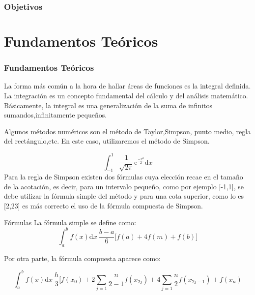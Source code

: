 \documentclass{beamer}
\begin{document}
\begin{frame}

\frametitle{Objetivos }

\end{frame}

\section{Fundamentos Teóricos}


\begin{frame}
\frametitle{Fundamentos Teóricos}
\begin{block}{}
La forma más común a la hora de hallar áreas de funciones es la integral definida.
La integración es un concepto fundamental del cálculo y del análisis matemático. Básicamente, la integral es una generalización 
de la suma de infinitos sumandos,infinitamente pequeños.
\end{block}
\begin{block}{}
 Algunos métodos numéricos son el método de Taylor,Simpson, punto medio, regla del rectángulo,etc. En este caso, utilizaremos el método de Simpson.
\end{block}
\end{frame}

\begin{frame}
\begin{block}{}

\[\int_{-1}^{1} \frac{1}{\sqrt{2\pi}}\text{e}^{\frac{-x^2}{2}} \text{d}x\] 
Para la regla de Simpson existen dos fórmulas cuya elección recae en el tamaño de la acotación, es decir, para un intervalo pequeño, como por ejemplo [-1,1],
se debe utilizar la fórmula simple del método y para una cota superior, como lo es [2,23] es más correcto el uso de la fórmula compuesta de Simpson.
\end{block}

\end{frame}
\begin{frame}
\begin{block}{Fórmulas}
La fórmula simple se define como:
\[\int_{a}^{b} f(x)\text{d}x ~ \frac{b-a}{6}\big[f(a)+4f(m)+f(b)\big]\]\par
 
Por otra parte, la fórmula compuesta aparece como:

\[\int_{a}^{b} f(x)\text{d}x ~ \frac{h}{3}\big[f(x_0)+2\sum_{j=1}{\frac{n}{2-1}} f(x_{2j})+4 \sum_{j=1}{\frac{n}{2}}f(x_{2j-1})+f(x_n)\]

\end{block}

\end{frame}
\end{document}
